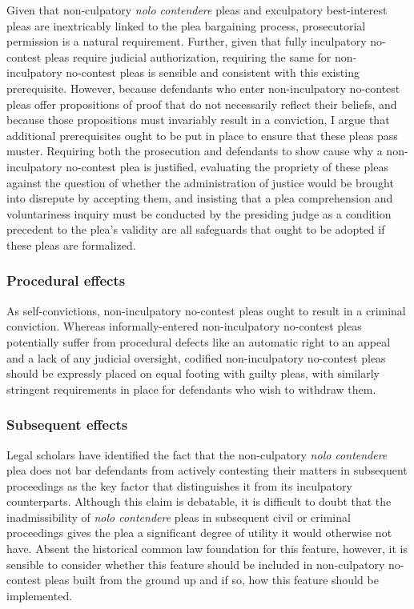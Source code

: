 Given that non-culpatory \textit{nolo contendere} pleas and exculpatory best-interest pleas are inextricably linked to the plea bargaining process, prosecutorial permission is a natural requirement. Further, given that fully inculpatory no-contest pleas require judicial authorization, requiring the same for non-inculpatory no-contest pleas is sensible and consistent with this existing prerequisite. However, because defendants who enter non-inculpatory no-contest pleas offer propositions of proof that do not necessarily reflect their beliefs, and because those propositions must invariably result in a conviction, I argue that additional prerequisites ought to be put in place to ensure that these pleas pass muster. Requiring both the prosecution and defendants to show cause why a non-inculpatory no-contest plea is justified, evaluating the propriety of these pleas against the question of whether the administration of justice would be brought into disrepute by accepting them, and insisting that a plea comprehension and voluntariness inquiry must be conducted by the presiding judge as a condition precedent to the plea's validity are all safeguards that ought to be adopted if these pleas are formalized.

\subsubsection{Procedural effects}

As self-convictions, non-inculpatory no-contest pleas ought to result in a criminal conviction. Whereas informally-entered non-inculpatory no-contest pleas potentially suffer from procedural defects like an automatic right to an appeal and a lack of any judicial oversight, codified non-inculpatory no-contest pleas should be expressly placed on equal footing with guilty pleas, with similarly stringent requirements in place for defendants who wish to withdraw them.

\subsubsection{Subsequent effects}

Legal scholars have identified the fact that the non-culpatory \textit{nolo contendere} plea does not bar defendants from actively contesting their matters in subsequent proceedings as the key factor that distinguishes it from its inculpatory counterparts. Although this claim is debatable, it is difficult to doubt that the inadmissibility of \textit{nolo contendere} pleas in subsequent civil or criminal proceedings gives the plea a significant degree of utility it would otherwise not have. Absent the historical common law foundation for this feature, however, it is sensible to consider whether this feature should be included in non-culpatory no-contest pleas built from the ground up and if so, how this feature should be implemented. 

